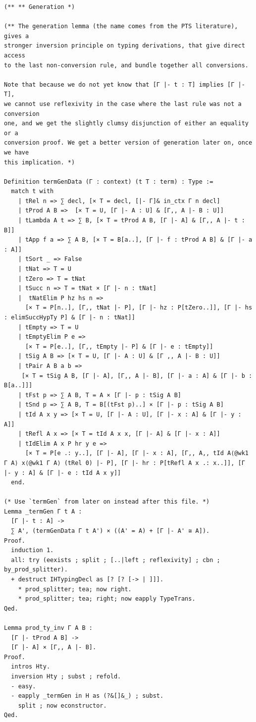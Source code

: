 \begin{lstlisting}
(** ** Generation *)

(** The generation lemma (the name comes from the PTS literature), gives a 
stronger inversion principle on typing derivations, that give direct access
to the last non-conversion rule, and bundle together all conversions.

Note that because we do not yet know that [Γ |- t : T] implies [Γ |- T],
we cannot use reflexivity in the case where the last rule was not a conversion
one, and we get the slightly clumsy disjunction of either an equality or a
conversion proof. We get a better version of generation later on, once we have
this implication. *)

Definition termGenData (Γ : context) (t T : term) : Type :=
  match t with
    | tRel n => ∑ decl, [× T = decl, [|- Γ]& in_ctx Γ n decl]
    | tProd A B =>  [× T = U, [Γ |- A : U] & [Γ,, A |- B : U]]
    | tLambda A t => ∑ B, [× T = tProd A B, [Γ |- A] & [Γ,, A |- t : B]]
    | tApp f a => ∑ A B, [× T = B[a..], [Γ |- f : tProd A B] & [Γ |- a : A]]
    | tSort _ => False
    | tNat => T = U
    | tZero => T = tNat
    | tSucc n => T = tNat × [Γ |- n : tNat]
    |  tNatElim P hz hs n =>
      [× T = P[n..], [Γ,, tNat |- P], [Γ |- hz : P[tZero..]], [Γ |- hs : elimSuccHypTy P] & [Γ |- n : tNat]]
    | tEmpty => T = U
    | tEmptyElim P e =>
      [× T = P[e..], [Γ,, tEmpty |- P] & [Γ |- e : tEmpty]]
    | tSig A B => [× T = U, [Γ |- A : U] & [Γ ,, A |- B : U]]
    | tPair A B a b =>
     [× T = tSig A B, [Γ |- A], [Γ,, A |- B], [Γ |- a : A] & [Γ |- b : B[a..]]]
    | tFst p => ∑ A B, T = A × [Γ |- p : tSig A B]
    | tSnd p => ∑ A B, T = B[(tFst p)..] × [Γ |- p : tSig A B]
    | tId A x y => [× T = U, [Γ |- A : U], [Γ |- x : A] & [Γ |- y : A]]
    | tRefl A x => [× T = tId A x x, [Γ |- A] & [Γ |- x : A]]
    | tIdElim A x P hr y e => 
      [× T = P[e .: y..], [Γ |- A], [Γ |- x : A], [Γ,, A,, tId A⟨@wk1 Γ A⟩ x⟨@wk1 Γ A⟩ (tRel 0) |- P], [Γ |- hr : P[tRefl A x .: x..]], [Γ |- y : A] & [Γ |- e : tId A x y]]
  end.

(* Use `termGen` from later on instead after this file. *)
Lemma _termGen Γ t A :
  [Γ |- t : A] ->
  ∑ A', (termGenData Γ t A') × ((A' = A) + [Γ |- A' ≅ A]).
Proof.
  induction 1.
  all: try (eexists ; split ; [..|left ; reflexivity] ; cbn ; by_prod_splitter).
  + destruct IHTypingDecl as [? [? [-> | ]]].
    * prod_splitter; tea; now right.
    * prod_splitter; tea; right; now eapply TypeTrans.
Qed.

Lemma prod_ty_inv Γ A B :
  [Γ |- tProd A B] ->
  [Γ |- A] × [Γ,, A |- B].
Proof.
  intros Hty.
  inversion Hty ; subst ; refold.
  - easy.
  - eapply _termGen in H as (?&[]&_) ; subst.
    split ; now econstructor.
Qed.


\end{lstlisting}

